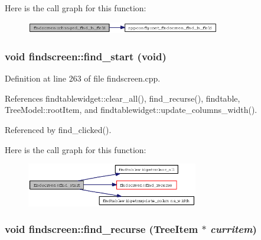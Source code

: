 Here is the call graph for this function:\begin{figure}[H]
\begin{center}
\leavevmode
\includegraphics[width=240pt]{classfindscreen_dca80696c1d3b77a0ebe8335157bf6e7_cgraph}
\end{center}
\end{figure}
\subsubsection{\setlength{\rightskip}{0pt plus 5cm}void findscreen::find\_\-start (void)\hspace{0.3cm}{\tt  [private]}}\label{classfindscreen_c07d8e7cc43f0ea168768e94d7c83099}




Definition at line 263 of file findscreen.cpp.

References findtablewidget::clear\_\-all(), find\_\-recurse(), findtable, Tree\-Model::root\-Item, and findtablewidget::update\_\-columns\_\-width().

Referenced by find\_\-clicked().

Here is the call graph for this function:\begin{figure}[H]
\begin{center}
\leavevmode
\includegraphics[width=212pt]{classfindscreen_c07d8e7cc43f0ea168768e94d7c83099_cgraph}
\end{center}
\end{figure}
\subsubsection{\setlength{\rightskip}{0pt plus 5cm}void findscreen::find\_\-recurse ({\bf Tree\-Item} $\ast$ {\em curritem})\hspace{0.3cm}{\tt  [private]}}\label{classfindscreen_b962b1004be0e8afb8123a108d9cf73a}




